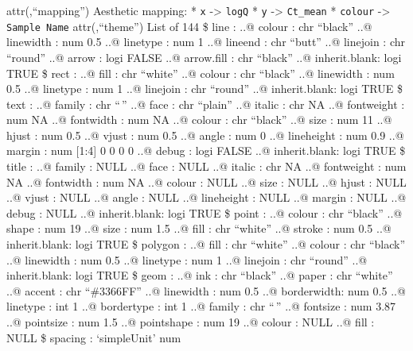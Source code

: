 \documentclass[
]{article}
\begin{document}
attr(,``mapping'') Aesthetic mapping: * \texttt{x} -\textgreater{}
\texttt{logQ} * \texttt{y} -\textgreater{} \texttt{Ct\_mean} *
\texttt{colour} -\textgreater{} \texttt{Sample\ Name} attr(,``theme'')
List of 144 \$ line : ..@ colour : chr ``black'' ..@ linewidth : num 0.5
..@ linetype : num 1 ..@ lineend : chr ``butt'' ..@ linejoin : chr
``round'' ..@ arrow : logi FALSE ..@ arrow.fill : chr ``black'' ..@
inherit.blank: logi TRUE \$ rect : ..@ fill : chr ``white'' ..@ colour :
chr ``black'' ..@ linewidth : num 0.5 ..@ linetype : num 1 ..@ linejoin
: chr ``round'' ..@ inherit.blank: logi TRUE \$ text : ..@ family : chr
``\,'' ..@ face : chr ``plain'' ..@ italic : chr NA ..@ fontweight : num
NA ..@ fontwidth : num NA ..@ colour : chr ``black'' ..@ size : num 11
..@ hjust : num 0.5 ..@ vjust : num 0.5 ..@ angle : num 0 ..@ lineheight
: num 0.9 ..@ margin : num {[}1:4{]} 0 0 0 0 ..@ debug : logi FALSE ..@
inherit.blank: logi TRUE \$ title : ..@ family : NULL ..@ face : NULL
..@ italic : chr NA ..@ fontweight : num NA ..@ fontwidth : num NA ..@
colour : NULL ..@ size : NULL ..@ hjust : NULL ..@ vjust : NULL ..@
angle : NULL ..@ lineheight : NULL ..@ margin : NULL ..@ debug : NULL
..@ inherit.blank: logi TRUE \$ point : ..@ colour : chr ``black'' ..@
shape : num 19 ..@ size : num 1.5 ..@ fill : chr ``white'' ..@ stroke :
num 0.5 ..@ inherit.blank: logi TRUE \$ polygon : ..@ fill : chr
``white'' ..@ colour : chr ``black'' ..@ linewidth : num 0.5 ..@
linetype : num 1 ..@ linejoin : chr ``round'' ..@ inherit.blank: logi
TRUE \$ geom : ..@ ink : chr ``black'' ..@ paper : chr ``white'' ..@
accent : chr ``\#3366FF'' ..@ linewidth : num 0.5 ..@ borderwidth: num
0.5 ..@ linetype : int 1 ..@ bordertype : int 1 ..@ family : chr ``\,''
..@ fontsize : num 3.87 ..@ pointsize : num 1.5 ..@ pointshape : num 19
..@ colour : NULL ..@ fill : NULL \$ spacing : `simpleUnit' num
\end{document}
